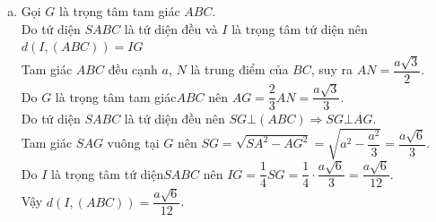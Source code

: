 \begin{ex}
{\begin{enumerate}[a)]
	Suy ra $\vec{SB}+\vec{SC}+\vec{AB}+\vec{AC}=2\left(\vec{SN}+\vec{AN}\right)$\\
	Do $M$ là trung điểm của $SA$ nên $\vec{NA}+\vec{NS}=2\vec{NM}\Leftrightarrow \vec{AN}+\vec{SN}=2\vec{MN}$.\\
	Do đó $\vec{SB}+\vec{SC}+\vec{AB}+\vec{AC}=2 \cdot 2 \cdot \vec{MN}=4\vec{MN}$.
	\item Gọi $G$ là trọng tâm tam giác $ABC$.\\
	Do tứ diện $SABC$ là tứ diện đều và $I$ là trọng tâm tứ diện nên $d\left(I,(ABC)\right)=IG$\\
	Tam giác $ABC$ đều cạnh $a$, $N$ là trung điểm của $BC$, suy ra $AN=\dfrac{a\sqrt{3}}{2}$.\\
	Do $G$ là trọng tâm tam giác$ABC$ nên $AG=\dfrac{2}{3}AN=\dfrac{a\sqrt{3}}{3}$.\\
	Do tứ diện $SABC$ là tứ diện đều nên $SG\bot (ABC)\Rightarrow SG\bot AG$.\\
	Tam giác $SAG$ vuông tại $G$ nên $SG=\sqrt{SA^2-AG^2}=\sqrt{a^2-\dfrac{a^2}{3}}=\dfrac{a\sqrt{6}}{3}$.\\
	Do $I$ là trọng tâm tứ diện$SABC$ nên $IG=\dfrac{1}{4}SG=\dfrac{1}{4} \cdot \dfrac{a\sqrt{6}}{3}=\dfrac{a\sqrt{6}}{12}$.\\
	Vậy $d\left(I,(ABC)\right)=\dfrac{a\sqrt{6}}{12}$.
	\end{enumerate}
	}
\end{ex}
